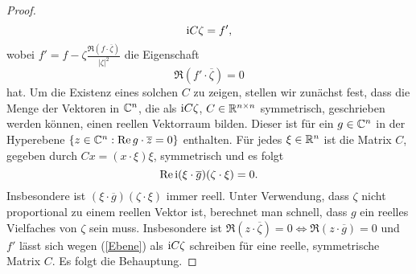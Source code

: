 \begin{proof}
\begin{equation}
	\mathrm i C \zeta = f',
\end{equation}
wobei $f' = f - \zeta \frac{\Re( f\cdot\overline\zeta)}{|\zeta|^2}$ die Eigenschaft
\begin{equation}
	\label{Ebene}
\Re (f'\cdot\overline\zeta) = 0
\end{equation}
hat. Um die Existenz eines solchen $C$ zu zeigen, stellen wir zunächst fest, dass die Menge der Vektoren in $\mathbb C^n$, die als $\mathrm i C \zeta$, $C \in \mathbb R^{n \times n}$ symmetrisch, geschrieben werden können, einen reellen Vektorraum bilden. Dieser ist für ein $g \in \mathbb C^n$ in der Hyperebene $\{ z \in \mathbb C^n : \operatorname{Re} g\cdot \overline z = 0 \}$ enthalten. Für jedes $\xi \in \mathbb R^n$ ist die Matrix $C$, gegeben durch $C x =  (x\cdot\xi)\xi$, symmetrisch und es folgt
\begin{equation}
\operatorname{Re} \mathrm i (\xi\cdot\overline g)(\zeta\cdot\xi) = 0.
\end{equation}
Insbesondere ist $(\xi\cdot\overline g)(\zeta\cdot\xi) $ immer reell. Unter Verwendung, dass $\zeta$ nicht proportional zu einem reellen Vektor ist, berechnet man schnell, dass $g$ ein reelles Vielfaches von $\zeta$ sein muss. Insbesondere ist $\Re(z\cdot\overline\zeta) = 0 \Leftrightarrow \Re(z\cdot \overline g) = 0$ und $f'$ lässt sich wegen (\ref{Ebene}) als $\mathrm i C \zeta$ schreiben für eine reelle, symmetrische Matrix $C$.  Es folgt die Behauptung.
\end{proof}


